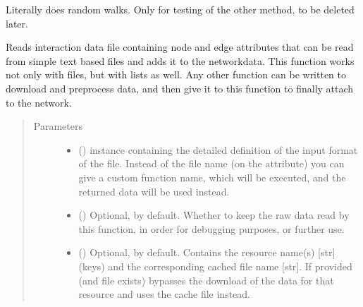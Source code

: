 \documentclass[letterpaper,10pt,english]{sphinxmanual}
\begin{document}
\begin{fulllineitems}

\begin{fulllineitems}
\label{\detokenize{main:pypath.main.PyPath.random_walk_with_return2}}
Literally does random walks.
Only for testing of the other method, to be deleted later.

\end{fulllineitems}


\begin{fulllineitems}
\label{\detokenize{main:pypath.main.PyPath.read_data_file}}
Reads interaction data file containing node and edge attributes
that can be read from simple text based files and adds it to the
networkdata. This function works not only with files, but with
lists as well. Any other function can be written to download and
preprocess data, and then give it to this function to finally
attach to the network.
\begin{quote}\begin{description}
\item[{Parameters}] \leavevmode\begin{itemize}
\item {} 
 () \textendash{}  instance
containing the detailed definition of the input format of
the file. Instead of the file name (on the
attribute) you can give a custom function name, which will
be executed, and the returned data will be used instead.

\item {} 
 () \textendash{} Optional,  by default. Whether to keep the raw data
read by this function, in order for debugging purposes, or
further use.

\item {} 
 () \textendash{} Optional, \sphinxcode{\sphinxupquote{\{\}}} by default. Contains the resource name(s)
{[}str{]} (keys) and the corresponding cached file name {[}str{]}.
If provided (and file exists) bypasses the download of the
data for that resource and uses the cache file instead.


\end{itemize}
\end{description}
\end{quote}
\end{fulllineitems}
\end{fulllineitems}
\end{document}
